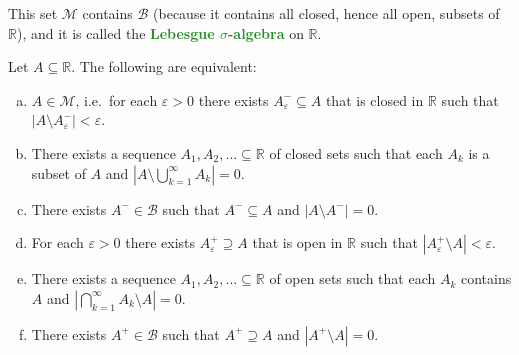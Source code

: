 \documentclass[11pt]{scrartcl}
\providecommand{\eps}{\varepsilon}
\providecommand{\RR}{\mathbb R}
\providecommand{\ii}{\item}
\providecommand{\vocab}[1]{{\textbf{\textcolor{ForestGreen}{#1}}}}
\providecommand{\abs}[1]{\left\lvert #1\right\rvert}
\begin{document}
This set $\mathcal M$ contains $\mathcal B$
(because it contains all closed, hence all open, subsets of $\RR$),
and it is called the \vocab{Lebesgue $\sigma$-algebra} on $\RR$.

\begin{prop}
    \label{prop:lebesgue-criteria}
    Let $A\subseteq\RR$. The following are equivalent:
    \begin{enumerate}[(a)]
        \ii $A\in\mathcal M$, i.e.\ for each $\eps>0$ there exists
	$A^-_\eps\subseteq A$ that is closed in $\RR$
	such that $\abs{A\setminus A_\eps^-} < \eps$.
	\ii There exists a sequence $A_1,A_2,\ldots\subseteq\RR$ of closed sets
	such that each $A_k$ is a subset of $A$ and
	$\abs{A\setminus\bigcup_{k=1}^\infty A_k} = 0$.
	\ii There exists $A^-\in\mathcal B$ such that $A^-\subseteq A$
	and $\abs{A\setminus A^-} = 0$.
	\ii For each $\eps>0$ there exists $A_\eps^+\supseteq A$
	that is open in $\RR$ such that $\abs{A_\eps^+\setminus A}<\eps$.
	\ii There exists a sequence $A_1,A_2,\ldots\subseteq\RR$
	of open sets such that each $A_k$ contains $A$ and
	$\abs{\bigcap_{k=1}^\infty A_k\setminus A} = 0$.
	\ii There exists $A^+\in\mathcal B$ such that
	$A^+\supseteq A$ and $\abs{A^+\setminus A} = 0$.
    \end{enumerate}
\end{prop}
\end{document}

